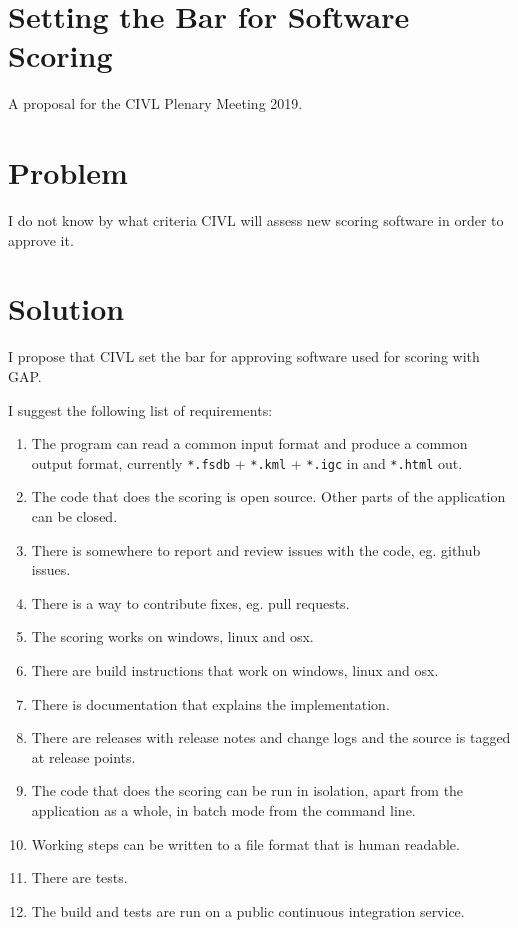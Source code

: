 \documentclass{article}
\begin{document}
\section*{Setting the Bar for Software Scoring}

A proposal for the CIVL Plenary Meeting 2019.

\section*{Problem}
I do not know by what criteria CIVL will assess new scoring software in order
to approve it.

\section*{Solution}
I propose that CIVL set the bar for approving software used for scoring with
GAP.

I suggest the following list of requirements:\\
\begin{enumerate}
    \item The program can read a common input format and produce a common
    output format, currently \texttt{*.fsdb} + \texttt{*.kml} + \texttt{*.igc}
    in and \texttt{*.html} out.
    \item The code that does the scoring is open source. Other parts of the
    application can be closed.
    \item There is somewhere to report and review issues with the code, eg.
    github issues.
    \item There is a way to contribute fixes, eg. pull requests.
    \item The scoring works on windows, linux and osx.
    \item There are build instructions that work on windows, linux and osx.
    \item There is documentation that explains the implementation.
    \item There are releases with release notes and change logs and the source
    is tagged at release points.
    \item The code that does the scoring can be run in isolation, apart from
    the application as a whole, in batch mode from the command line.
    \item Working steps can be written to a file format that is human readable.
    \item There are tests.
    \item The build and tests are run on a public continuous integration service.
\end{enumerate}
\end{document}
